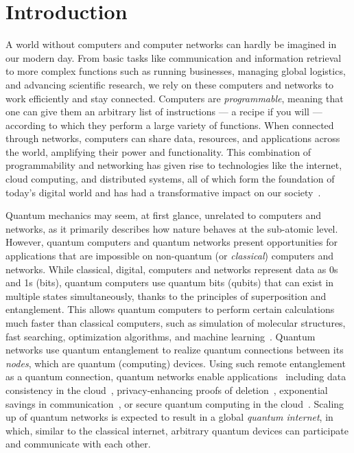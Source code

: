 \chapter{Introduction}
\label{chp:intro}

A world without computers and computer networks can hardly be imagined in our modern day.
From basic tasks like communication and information retrieval to more complex functions such as running businesses, managing global logistics, and advancing scientific research, we rely on these computers and networks to work efficiently and stay connected.
Computers are \emph{programmable}, meaning that one can give them an arbitrary list of instructions --- a recipe if you will --- according to which they perform a large variety of functions.
When connected through networks, computers can share data, resources, and applications across the world, amplifying their power and functionality.
This combination of programmability and networking has given rise to technologies like the internet, cloud computing, and distributed systems, all of which form the foundation of today's digital world and has had a transformative impact on our society~\cite{castells_impact_2013}.

Quantum mechanics may seem, at first glance, unrelated to computers and networks, as it primarily describes how nature behaves at the sub-atomic level.
However, quantum computers and quantum networks present opportunities for applications that are impossible on non-quantum (or \emph{classical}) computers and networks.
While classical, digital, computers and networks represent data as 0s and 1s (bits), quantum computers use quantum bits (qubits) that can exist in multiple states simultaneously, thanks to the principles of superposition and entanglement.
This allows quantum computers to perform certain calculations much faster than classical computers, such as simulation of molecular structures, fast searching, optimization algorithms, and machine learning~\cite{montanaro_quantum_2016, dalzell_quantum_2023}.
Quantum networks use quantum entanglement to realize quantum connections between its \emph{nodes}, which are quantum (computing) devices.
Using such remote entanglement as a quantum connection, quantum networks enable applications~\cite{wehner_2018_stages} including data consistency in the cloud~\cite{benor_2005_byzantine}, privacy-enhancing proofs of deletion~\cite{poremba_quantum_2022}, exponential savings in communication~\cite{guerin_exponential_2016}, or secure quantum computing in the cloud~\cite{broadbent_2009_ubqc,childs_2005_secure_qc}.
Scaling up of quantum networks is expected to result in a global \textit{quantum internet}, in which, similar to the classical internet, arbitrary quantum devices can participate and communicate with each other.


